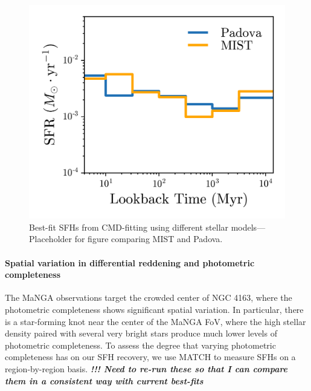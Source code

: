 \documentclass[preprint2]{aastex62}
\newcommand{\todo}[1]{\textbf{\textit{!!! #1}}}
\begin{document}
\begin{figure}
  \begin{center}
    \includegraphics[width=\linewidth]{figs/tracks_SFH_comp.png}
    \caption{{\sc Best-fit SFHs from CMD-fitting using different stellar models---} Placeholder for figure comparing MIST and Padova.}
    \label{fig:tracks}
  \end{center}
\end{figure}

\paragraph{Spatial variation in differential reddening and photometric completeness} The MaNGA observations target the crowded center of NGC 4163, where the photometric completeness shows significant spatial variation. In particular, there is a star-forming knot near the center of the MaNGA FoV, where the high stellar density paired with several very bright stars produce much lower levels of photometric completeness. To assess the degree that varying photometric completeness has on our SFH recovery, we use MATCH to measure SFHs on a region-by-region basis. \todo{Need to re-run these so that I can compare them in a consistent way with current best-fits}
\end{document}
